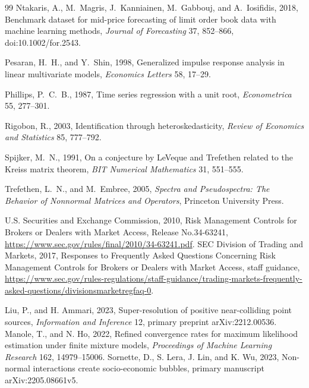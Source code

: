 \documentclass[12pt]{article}
\theoremstyle{definition}
\theoremstyle{remark}
\begin{document}
\begin{thebibliography}{99}
Ntakaris, A., M.~Magris, J.~Kanniainen, M.~Gabbouj, and A.~Iosifidis, 2018, Benchmark dataset for mid-price forecasting of limit order book data with machine learning methods, \emph{Journal of Forecasting} 37, 852--866, doi:10.1002/for.2543.

Pesaran, H.~H., and Y.~Shin, 1998, Generalized impulse response analysis in linear multivariate models, \emph{Economics Letters} 58, 17--29.

Phillips, P.~C.~B., 1987, Time series regression with a unit root, \emph{Econometrica} 55, 277--301.

Rigobon, R., 2003, Identification through heteroskedasticity, \emph{Review of Economics and Statistics} 85, 777--792.

Spijker, M.~N., 1991, On a conjecture by LeVeque and Trefethen related to the Kreiss matrix theorem, \emph{BIT Numerical Mathematics} 31, 551--555.

Trefethen, L.~N., and M.~Embree, 2005, \emph{Spectra and Pseudospectra: The Behavior of Nonnormal Matrices and Operators}, Princeton University Press.


U.S. Securities and Exchange Commission, 2010, Risk Management Controls for Brokers or Dealers with Market Access, Release No.34-63241, \url{https://www.sec.gov/rules/final/2010/34-63241.pdf}.
SEC Division of Trading and Markets, 2017, Responses to Frequently Asked Questions Concerning Risk Management Controls for Brokers or Dealers with Market Access, staff guidance, \url{https://www.sec.gov/rules-regulations/staff-guidance/trading-markets-frequently-asked-questions/divisionsmarketregfaq-0}.


Liu, P., and H. Ammari, 2023, Super-resolution of positive near-colliding point sources, \emph{Information and Inference} 12, primary preprint arXiv:2212.00536.
Manole, T., and N. Ho, 2022, Refined convergence rates for maximum likelihood estimation under finite mixture models, \emph{Proceedings of Machine Learning Research} 162, 14979--15006.
Sornette, D., S. Lera, J. Lin, and K. Wu, 2023, Non-normal interactions create socio-economic bubbles, primary manuscript arXiv:2205.08661v5.


\end{thebibliography}
\end{document}
